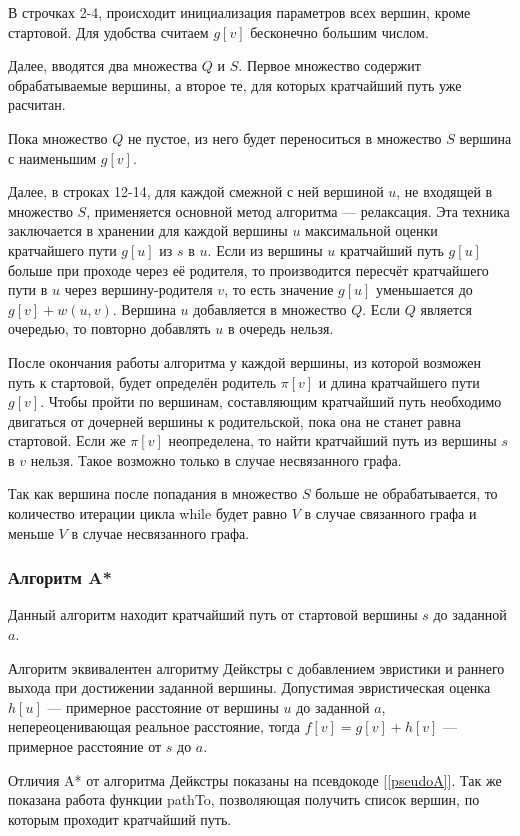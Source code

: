 В строчках 2-4, происходит инициализация параметров всех вершин, кроме стартовой. Для удобства считаем $g[v]$ бесконечно большим числом.

Далее, вводятся два множества $Q$ и $S$. Первое множество содержит обрабатываемые вершины, а второе те, для которых кратчайший путь уже расчитан.

Пока множество $Q$ не пустое, из него будет переноситься в множество $S$ вершина с наименьшим $g[v]$.

Далее, в строках 12-14, для каждой смежной с ней вершиной $u$, не входящей в множество $S$, применяется основной метод алгоритма — релаксация. Эта техника заключается в хранении для каждой вершины $u$ максимальной оценки кратчайшего пути $g[u]$ из $s$ в $u$. Если из вершины $u$ кратчайший путь $g[u]$ больше при проходе через её родителя, то производится пересчёт кратчайшего пути в $u$ через вершину-родителя $v$, то есть значение $g[u]$ уменьшается до $g[v] + w(u,v)$. Вершина $u$ добавляется в множество $Q$. Если $Q$ является очередью, то повторно добавлять $u$ в очередь нельзя.

После окончания работы алгоритма у каждой вершины, из которой возможен путь к стартовой, будет определён родитель $\pi[v]$ и длина кратчайшего пути $g[v]$. Чтобы пройти по вершинам, составляющим кратчайший путь необходимо двигаться от дочерней вершины к родительской, пока она не станет равна стартовой. Если же $\pi[v]$ неопределена, то найти кратчайший путь из вершины $s$ в $v$ нельзя. Такое возможно только в случае несвязанного графа.

Так как вершина после попадания в множество $S$ больше не обрабатывается, то количество итерации цикла while будет равно $V$ в случае связанного графа и меньше $V$ в случае несвязанного графа.

\subsubsection{Алгоритм A*}
Данный алгоритм находит кратчайший путь от стартовой вершины $s$ до заданной $a$.

Алгоритм эквивалентен алгоритму Дейкстры с добавлением эвристики и раннего выхода при достижении заданной вершины. Допустимая эвристическая оценка $h[u]$ — примерное расстояние от вершины $u$ до заданной $a$, непереоценивающая реальное расстояние, тогда $f[v] = g[v] + h[v]$ — примерное расстояние от $s$ до $a$.

Отличия A* от алгоритма Дейкстры показаны на псевдокоде [\ref{pseudoA}]. Так же показана работа функции pathTo, позволяющая получить список вершин, по которым проходит кратчайший путь.

